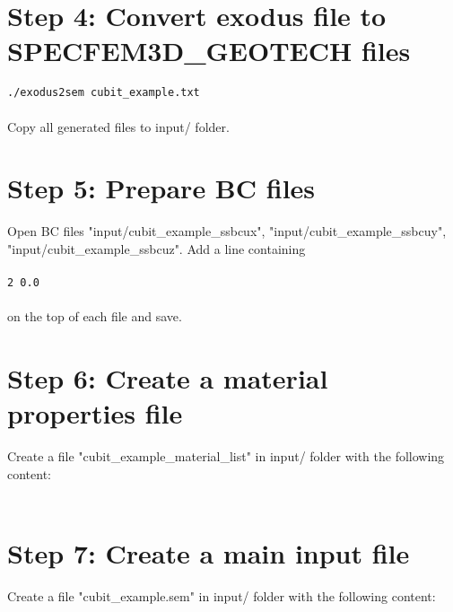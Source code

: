 \section*{Step 4: Convert exodus file to SPECFEM3D\_GEOTECH files}

\texttt{./exodus2sem cubit\_example.txt}\\
\\
Copy all generated files to input/ folder.

\section*{Step 5: Prepare BC files}

Open BC files "input/cubit\_example\_ssbcux", "input/cubit\_example\_ssbcuy", "input/cubit\_example\_ssbcuz". Add a line containing\\
\\
\texttt{2 0.0}\\
\\
on the top of each file and save.

\section*{Step 6: Create a material properties file}

Create a file "cubit\_example\_material\_list" in input/ folder with the following content:
\\
\\
\colorbox{gray}{
\parbox{16cm}{
}}

\section*{Step 7: Create a main input file}

Create a file "cubit\_example.sem" in input/ folder with the following content:
\\

